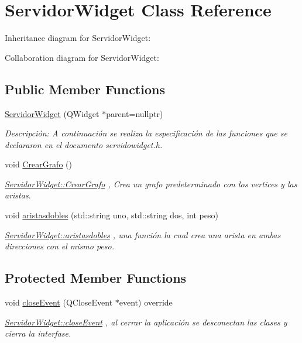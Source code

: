 \hypertarget{class_servidor_widget}{}\section{Servidor\+Widget Class Reference}
\label{class_servidor_widget}


Inheritance diagram for Servidor\+Widget\+:


Collaboration diagram for Servidor\+Widget\+:
\subsection*{Public Member Functions}
\begin{DoxyCompactItemize}
\item 
\hyperlink{class_servidor_widget_a089df836813775a479a4db2e78ddef03}{Servidor\+Widget} (Q\+Widget $\ast$parent=nullptr)
\begin{DoxyCompactList}\small\item\em Descripción\+: A continuación se realiza la especificación de las funciones que se declararon en el documento servidowidget.\+h. \end{DoxyCompactList}\item 
\mbox{\label{class_servidor_widget_aabfb3812d49ca8c81278af1bd48563f8}} 
void \hyperlink{class_servidor_widget_aabfb3812d49ca8c81278af1bd48563f8}{Crear\+Grafo} ()
\begin{DoxyCompactList}\small\item\em \hyperlink{class_servidor_widget_aabfb3812d49ca8c81278af1bd48563f8}{Servidor\+Widget\+::\+Crear\+Grafo} , Crea un grafo predeterminado con los vertices y las aristas. \end{DoxyCompactList}\item 
void \hyperlink{class_servidor_widget_a5bab6515039181da270565aa44371a43}{aristasdobles} (std\+::string uno, std\+::string dos, int peso)
\begin{DoxyCompactList}\small\item\em \hyperlink{class_servidor_widget_a5bab6515039181da270565aa44371a43}{Servidor\+Widget\+::aristasdobles} , una función la cual crea una arista en ambas direcciones con el mismo peso. \end{DoxyCompactList}\end{DoxyCompactItemize}
\subsection*{Protected Member Functions}
\begin{DoxyCompactItemize}
\item 
void \hyperlink{class_servidor_widget_a9cf51728afbc95d5838180b6b5080312}{close\+Event} (Q\+Close\+Event $\ast$event) override
\begin{DoxyCompactList}\small\item\em \hyperlink{class_servidor_widget_a9cf51728afbc95d5838180b6b5080312}{Servidor\+Widget\+::close\+Event} , al cerrar la aplicación se desconectan las clases y cierra la interfase. \end{DoxyCompactList}\end{DoxyCompactItemize}


